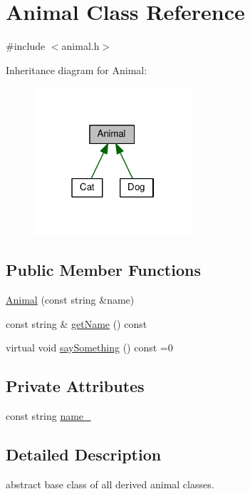 \hypertarget{classAnimal}{}\section{Animal Class Reference}
\label{classAnimal}


{\ttfamily \#include $<$animal.\+h$>$}



Inheritance diagram for Animal\+:\nopagebreak
\begin{figure}[H]
\begin{center}
\leavevmode
\includegraphics[width=166pt]{classAnimal__inherit__graph}
\end{center}
\end{figure}
\subsection*{Public Member Functions}
\begin{DoxyCompactItemize}
\item 
\hyperlink{classAnimal_a4ef4b49b9ed502193d9a1e447af9dca7}{Animal} (const string \&name)
\item 
const string \& \hyperlink{classAnimal_a9e5f35bbcafaddb2af949273d04a0055}{get\+Name} () const
\item 
virtual void \hyperlink{classAnimal_a1da8e52d19af5bd43a3755d9d5454598}{say\+Something} () const =0
\end{DoxyCompactItemize}
\subsection*{Private Attributes}
\begin{DoxyCompactItemize}
\item 
const string \hyperlink{classAnimal_af9bbbc58067910197fe5d7330e5cf09a}{name\+\_\+}
\end{DoxyCompactItemize}


\subsection{Detailed Description}
abstract base class of all derived animal classes.

